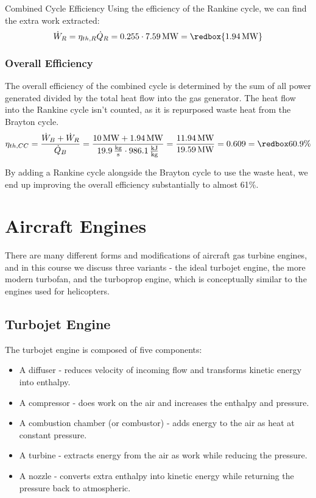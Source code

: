 \begin{example}[label=ex:combinedCycle]{Combined Cycle Efficiency}
  Using the efficiency of the Rankine cycle, we can find the extra work extracted:
  \begin{equation*}
    \dot{W}_{R} = \eta_{th, R}\dot{Q}_{R} = 0.255 \cdot 7.59\, {\rm MW} = \redbox{1.94\, {\rm MW}}
  \end{equation*}
  \subsubsection*{Overall Efficiency}
  The overall efficiency of the combined cycle is determined by the sum of all power generated divided by the total heat flow into the gas generator.  The heat flow into the Rankine cycle isn't counted, as it is repurposed waste heat from the Brayton cycle.
  \begin{equation*}
    \eta_{th, CC} = \frac{\dot{W}_{B} + \dot{W}_{R}}{\dot{Q}_{B}} = \frac{10\, {\rm MW} + 1.94\, {\rm MW}}{19.9\, \frac{\rm kg}{\rm s} \cdot 986.1\, \frac{\rm kJ}{\rm kg}} = \frac{11.94\, {\rm MW}}{19.59\, {\rm MW}} = 0.609 = \redbox{60.9\%}
  \end{equation*}

  By adding a Rankine cycle alongside the Brayton cycle to use the waste heat, we end up improving the overall efficiency substantially to almost 61\%.
\end{example}


\section{Aircraft Engines} \label{sec:aircraft}

There are many different forms and modifications of aircraft gas turbine engines, and in this course we discuss three variants - the ideal turbojet engine, the more modern turbofan, and the turboprop engine, which is conceptually similar to the engines used for helicopters.

\subsection{Turbojet Engine}
The turbojet engine is composed of five components:
\begin{itemize}
\item A diffuser - reduces velocity of incoming flow and transforms kinetic energy into enthalpy.
\item A compressor - does work on the air and increases the enthalpy and pressure.
\item A combustion chamber (or combustor) - adds energy to the air as heat at constant pressure.
\item A turbine - extracts energy from the air as work while reducing the pressure.
\item A nozzle - converts extra enthalpy into kinetic energy while returning the pressure back to atmospheric.
\end{itemize}

